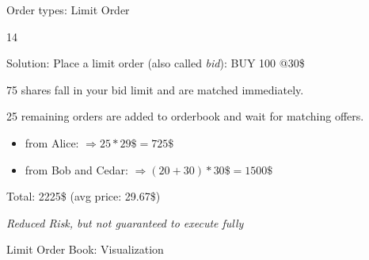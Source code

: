 \documentclass[10pt]{beamer}
\begin{document}
\begin{frame}[fragile]{Order types: Limit Order}
\begin{overlayarea}{\textwidth}{14\baselineskip}
{Solution: Place a limit order (also called \emph{bid}): BUY 100 @30\$

75 shares fall in your bid limit and are matched immediately.

{\color{mygreen}25}  remaining orders are added to orderbook and wait for matching offers.

\begin{itemize}
\item from Alice:   $\Rightarrow 25*29\$ = 725\$$
\item from Bob and Cedar:   $\Rightarrow (20+30)*30\$ = 1500\$$
\end{itemize}
Total: 2225\$ (avg price: 29.67\$)

\vspace{2mm}

\emph{Reduced Risk, but not guaranteed to execute fully}
}



\end{overlayarea}
\end{frame}

\begin{frame}[fragile]{Limit Order Book: Visualization}


\end{frame}
\end{document}
